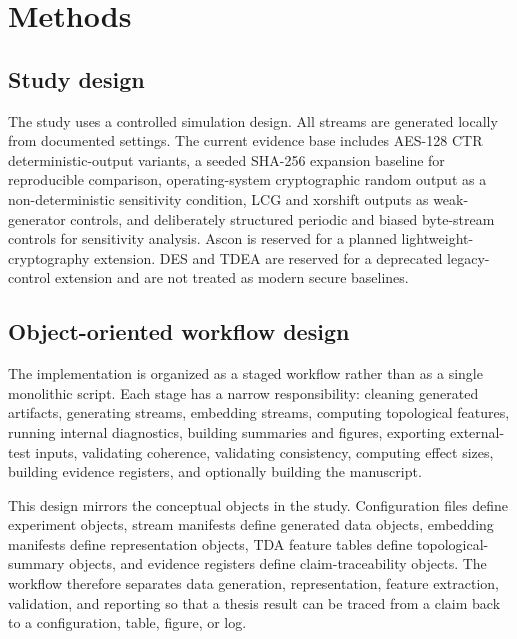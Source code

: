 
\section{Methods}
\label{sec:methods}

\subsection{Study design}
\label{subsec:study-design}

The study uses a controlled simulation design. All streams are generated locally from documented settings. The current evidence base includes AES-128 CTR deterministic-output variants, a seeded SHA-256 expansion baseline for reproducible comparison, operating-system cryptographic random output as a non-deterministic sensitivity condition, LCG and xorshift outputs as weak-generator controls, and deliberately structured periodic and biased byte-stream controls for sensitivity analysis. Ascon is reserved for a planned lightweight-cryptography extension. DES and TDEA are reserved for a deprecated legacy-control extension and are not treated as modern secure baselines.

\subsection{Object-oriented workflow design}
\label{subsec:object-oriented-workflow}

The implementation is organized as a staged workflow rather than as a single monolithic script. Each stage has a narrow responsibility: cleaning generated artifacts, generating streams, embedding streams, computing topological features, running internal diagnostics, building summaries and figures, exporting external-test inputs, validating coherence, validating consistency, computing effect sizes, building evidence registers, and optionally building the manuscript.

This design mirrors the conceptual objects in the study. Configuration files define experiment objects, stream manifests define generated data objects, embedding manifests define representation objects, TDA feature tables define topological-summary objects, and evidence registers define claim-traceability objects. The workflow therefore separates data generation, representation, feature extraction, validation, and reporting so that a thesis result can be traced from a claim back to a configuration, table, figure, or log.

